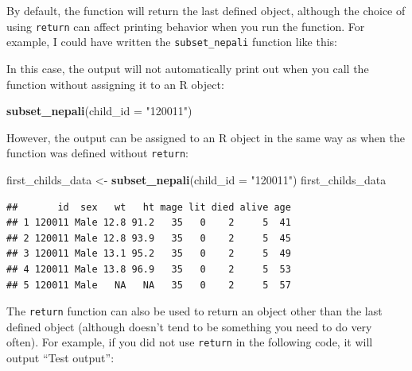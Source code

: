 \documentclass[]{book}
\makeatletter
\newenvironment{Shaded}{\begin{snugshade}}{\end{snugshade}}
\newcommand{\KeywordTok}[1]{\textcolor[rgb]{0.13,0.29,0.53}{\textbf{#1}}}
\newcommand{\DataTypeTok}[1]{\textcolor[rgb]{0.13,0.29,0.53}{#1}}
\newcommand{\StringTok}[1]{\textcolor[rgb]{0.31,0.60,0.02}{#1}}
\newcommand{\ControlFlowTok}[1]{\textcolor[rgb]{0.13,0.29,0.53}{\textbf{#1}}}
\newcommand{\OperatorTok}[1]{\textcolor[rgb]{0.81,0.36,0.00}{\textbf{#1}}}
\newcommand{\NormalTok}[1]{#1}
\newenvironment{kframe}{%
\medskip{}
\setlength{\fboxsep}{.8em}
 \def\at@end@of@kframe{}%
 \ifinner\ifhmode%
  \def\at@end@of@kframe{\end{minipage}}%
  \begin{minipage}{\columnwidth}%
 \fi\fi%
 \def\FrameCommand##1{\hskip\@totalleftmargin \hskip-\fboxsep
 \colorbox{shadecolor}{##1}\hskip-\fboxsep
     \hskip-\linewidth \hskip-\@totalleftmargin \hskip\columnwidth}%
 \MakeFramed {\advance\hsize-\width
   \@totalleftmargin\z@ \linewidth\hsize
   \@setminipage}}%
 {\par\unskip\endMakeFramed%
 \at@end@of@kframe}
\renewenvironment{Shaded}{\begin{kframe}}{\end{kframe}}
\theoremstyle{definition}
\theoremstyle{definition}
\theoremstyle{definition}
\theoremstyle{remark}
\makeatother
\begin{document}
By default, the function will return the last defined object, although
the choice of using \texttt{return} can affect printing behavior when
you run the function. For example, I could have written the
\texttt{subset\_nepali} function like this:

\begin{Shaded}
\end{Shaded}

In this case, the output will not automatically print out when you call
the function without assigning it to an R object:

\begin{Shaded}
\begin{Highlighting}[]
\KeywordTok{subset_nepali}\NormalTok{(}\DataTypeTok{child_id =} \StringTok{"120011"}\NormalTok{)}
\end{Highlighting}
\end{Shaded}

However, the output can be assigned to an R object in the same way as
when the function was defined without \texttt{return}:

\begin{Shaded}
\begin{Highlighting}[]
\NormalTok{first_childs_data <-}\StringTok{ }\KeywordTok{subset_nepali}\NormalTok{(}\DataTypeTok{child_id =} \StringTok{"120011"}\NormalTok{)}
\NormalTok{first_childs_data}
\end{Highlighting}
\end{Shaded}

\begin{verbatim}
##       id  sex   wt   ht mage lit died alive age
## 1 120011 Male 12.8 91.2   35   0    2     5  41
## 2 120011 Male 12.8 93.9   35   0    2     5  45
## 3 120011 Male 13.1 95.2   35   0    2     5  49
## 4 120011 Male 13.8 96.9   35   0    2     5  53
## 5 120011 Male   NA   NA   35   0    2     5  57
\end{verbatim}

The \texttt{return} function can also be used to return an object other
than the last defined object (although doesn't tend to be something you
need to do very often). For example, if you did not use \texttt{return}
in the following code, it will output ``Test output'':
\end{document}
